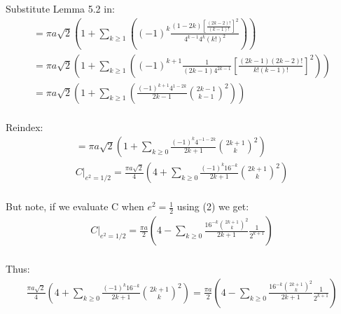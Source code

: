 \documentclass{article}
\begin{document}
Substitute Lemma 5.2 in:
\begin{equation*}
\begin{split}
	= \pi a\sqrt{2} \left( 1 +
	\sum_{k\geq 1}\left( (-1)^k\frac{(1-2k)\left[\frac{(2k-2)!}{(k-1)!}\right]^2}{4^{k-1}4^k(k!)^2}\right)\right)\\
	= \pi a\sqrt{2} \left( 1 +
	\sum_{k\geq 1}\left( (-1)^{k+1}\frac{1}{(2k-1)4^{2k-1}}\left[\frac{(2k-1)(2k-2)!}{k!(k-1)!}\right]^2\right)\right)\\
	= \pi a\sqrt{2} \left( 1 +
	\sum_{k\geq 1}\left( \frac{(-1)^{k+1}4^{1-2k}}{2k-1}{{2k-1}\choose{k-1}}^2\right)\right)\\
\end{split}
\end{equation*}

Reindex:
\begin{equation*}
\begin{split}
	= \pi a\sqrt{2} \left( 1 +
	\sum_{k\geq 0} \frac{(-1)^{k}4^{-1-2k}}{2k+1}{{2k+1}\choose k}^2\right)\\
	C\biggr\rvert_{e^2=1/2}  = \frac{\pi a\sqrt{2}}{4} \left( 4 +
	\sum_{k\geq 0} \frac{(-1)^{k}16^{-k}}{2k+1}{{2k+1}\choose k}^2\right)\\
\end{split}
\end{equation*}

But note, if we evaluate C when $e^2 = \frac{1}{2}$ using (2) we get:
\begin{equation*}
\begin{split}
	C\biggr\rvert_{e^2=1/2} = \frac{\pi a}{2}\left(4-\sum_{k\geq 0}\frac{16^{-k}{{2k+1}\choose k}^2}{2k+1}\frac{1}{2^{k+1}}\right)\\
\end{split}
\end{equation*}

Thus:
\begin{equation*}
\begin{split}
	\frac{\pi a\sqrt{2}}{4} \left( 4 +
	\sum_{k\geq 0} \frac{(-1)^{k}16^{-k}}{2k+1}{{2k+1}\choose k}^2\right)
	= \frac{\pi a}{2}\left(4-\sum_{k\geq 0}\frac{16^{-k}{{2k+1}\choose k}^2}{2k+1}\frac{1}{2^{k+1}}\right)\\
\end{split}
\end{equation*}
\end{document}
